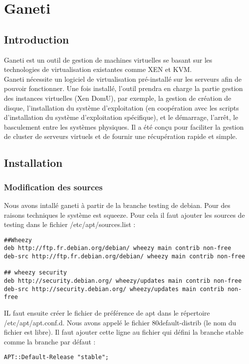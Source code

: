 
\chapter{Ganeti}
      \section{Introduction}
Ganeti est un outil de gestion de machines virtuelles se basant sur les technologies de virtualisation existantes comme XEN et KVM.\\
Ganeti nécessite un logiciel de virtualisation pré-installé sur les serveurs afin de pouvoir fonctionner. Une fois installé, 
l'outil prendra en charge la partie gestion des instances virtuelles (Xen DomU), par exemple, la gestion de création de disque, 
l'installation du système d'exploitation (en coopération avec les scripts d'installation du système d'exploitation 
spécifique), et le démarrage, l'arrêt, le basculement entre les systèmes physiques. Il a été conçu pour faciliter la gestion de 
cluster de serveurs virtuels et de fournir une récupération rapide et simple.


\section {Installation}
\subsection {Modification des sources}
Nous avons intallé ganeti à partir de la branche testing de debian. Pour des raisons techniques le système est squeeze. Pour cela il faut ajouter les sources de testing dans le fichier /etc/apt/sources.list :
\begin{lstlisting}
##Wheezy
deb http://ftp.fr.debian.org/debian/ wheezy main contrib non-free
deb-src http://ftp.fr.debian.org/debian/ wheezy main contrib non-free

## wheezy security
deb http://security.debian.org/ wheezy/updates main contrib non-free
deb-src http://security.debian.org/ wheezy/updates main contrib non-free
\end{lstlisting}

IL faut ensuite créer le fichier de préférence de apt dans le répertoire /etc/apt/apt.conf.d. Nous avons appelé le  fichier 80default-distrib (le nom du fichier est libre). Il faut ajouter cette ligne au fichier qui défini la branche stable comme la branche par défaut :
\begin{lstlisting}
APT::Default-Release "stable";
\end{lstlisting}

